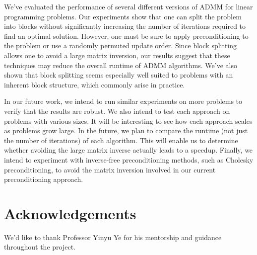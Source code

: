 \documentclass{article}
\begin{document}
{We've evaluated the performance of several different versions of ADMM for linear programming problems. Our experiments show that one can split the problem into blocks without significantly increasing the number of iterations required to find an optimal solution. However, one must be sure to apply preconditioning to the problem or use a randomly permuted update order. Since block splitting allows one to avoid a large matrix inversion, our results suggest that these techniques may reduce the overall runtime of ADMM algorithms. We've also shown that block splitting seems especially well suited to problems with an inherent block structure, which commonly arise in practice.

In our future work, we intend to run similar experiments on more problems to verify that the results are robust. We also intend to test each approach on problems with various sizes. It will be interesting to see how each approach scales as problems grow large. In the future, we plan to compare the runtime (not just the number of iterations) of each algorithm. This will enable us to determine whether avoiding the large matrix inverse actually leads to a speedup. Finally, we intend to experiment with inverse-free preconditioning methods, such as Cholesky preconditioning, to avoid the matrix inversion involved in our current preconditioning approach.

\vspace{0.5in}
\section{Acknowledgements}

We'd like to thank Professor Yinyu Ye for his mentorship and guidance throughout the project. 

}
\end{document}
